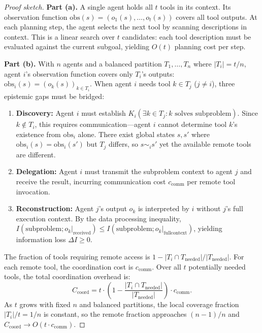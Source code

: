 \begin{proof}[Proof sketch]
\textbf{Part (a).} A single agent holds all $t$ tools in its context. Its observation function $\mathrm{obs}(s) = (o_1(s), \ldots, o_t(s))$ covers all tool outputs. At each planning step, the agent selects the next tool by scanning descriptions in context. This is a linear search over $t$ candidates: each tool description must be evaluated against the current subgoal, yielding $O(t)$ planning cost per step.

\textbf{Part (b).} With $n$ agents and a balanced partition $T_1, \ldots, T_n$ where $|T_i| = t/n$, agent $i$'s observation function covers only $T_i$'s outputs: $\mathrm{obs}_i(s) = (o_k(s))_{k \in T_i}$. When agent $i$ needs tool $k \in T_j$ ($j \ne i$), three epistemic gaps must be bridged:

\begin{enumerate}
\item \textbf{Discovery:} Agent $i$ must establish $K_i(\exists k \in T_j : k \text{ solves subproblem})$. Since $k \notin T_i$, this requires communication---agent $i$ cannot determine tool $k$'s existence from $\mathrm{obs}_i$ alone. There exist global states $s, s'$ where $\mathrm{obs}_i(s) = \mathrm{obs}_i(s')$ but $T_j$ differs, so $s \sim_i s'$ yet the available remote tools are different.
\item \textbf{Delegation:} Agent $i$ must transmit the subproblem context to agent $j$ and receive the result, incurring communication cost $c_{\mathrm{comm}}$ per remote tool invocation.
\item \textbf{Reconstruction:} Agent $j$'s output $o_k$ is interpreted by $i$ without $j$'s full execution context. By the data processing inequality, $I(\text{subproblem}; o_k|_{\mathrm{received}}) \le I(\text{subproblem}; o_k|_{\mathrm{full context}})$, yielding information loss $\Delta I \ge 0$.
\end{enumerate}

The fraction of tools requiring remote access is $1 - |T_i \cap T_{\mathrm{needed}}|/|T_{\mathrm{needed}}|$. For each remote tool, the coordination cost is $c_{\mathrm{comm}}$. Over all $t$ potentially needed tools, the total coordination overhead is:
\[
C_{\mathrm{coord}} = t \cdot \left(1 - \frac{|T_i \cap T_{\mathrm{needed}}|}{|T_{\mathrm{needed}}|}\right) \cdot c_{\mathrm{comm}}.
\]
As $t$ grows with fixed $n$ and balanced partitions, the local coverage fraction $|T_i|/t = 1/n$ is constant, so the remote fraction approaches $(n-1)/n$ and $C_{\mathrm{coord}} \to O(t \cdot c_{\mathrm{comm}})$.


\end{proof}
